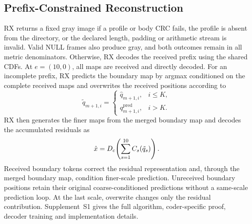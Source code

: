 \ifCLASSOPTIONonecolumn\else\fi
\subsection{Prefix-Constrained Reconstruction}
RX returns a fixed gray image if a profile or body CRC fails, the profile is absent from the directory, or the declared length, padding or arithmetic stream is invalid. Valid NULL frames also produce gray, and both outcomes remain in all metric denominators. Otherwise, RX decodes the received prefix using the shared CDFs. At $e=(10,0)$, all maps are received and directly decoded. For an incomplete prefix, RX predicts the boundary map by argmax conditioned on the complete received maps and overwrites the received positions according to
\begin{equation}
\tilde q_{m+1,i}=\begin{cases}\hat q_{m+1,i},&i\leq K,\\q^{\mathrm{pred}}_{m+1,i},&i>K.\end{cases}
\label{eq:overwrite}
\end{equation}
RX then generates the finer maps from the merged boundary map and decodes the accumulated residuals as
\begin{equation}
\hat x=D_c\!\left(\sum_{s=1}^{10}C_s(\tilde q_s)\right).
\label{eq:reconstruction}
\end{equation}
Received boundary tokens correct the residual representation and, through the merged boundary map, condition finer-scale prediction. Unreceived boundary positions retain their original coarse-conditioned predictions without a same-scale prediction loop. At the last scale, overwrite changes only the residual contribution. Supplement~S1 gives the full algorithm, coder-specific proof, decoder training and implementation details.
